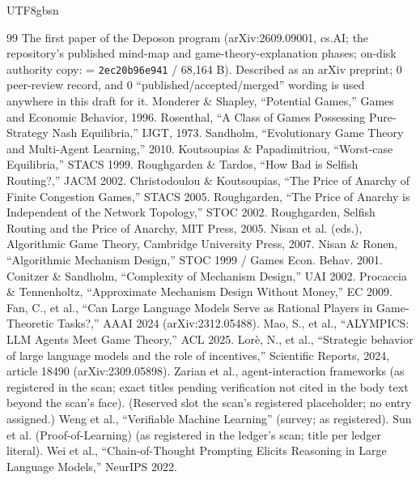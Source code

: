 \documentclass[11pt,letterpaper]{article}
\begin{document}
\begin{CJK}{UTF8}{gbsn}
\begin{thebibliography}{99}
 The first paper of the Deposon program (arXiv:2609.09001, cs.AI; the repository's published mind-map and game-theory-explanation phases; on-disk authority copy:  = \texttt{2ec20b96e941} / 68,164 B). Described as an arXiv preprint; 0 peer-review record, and 0 ``published/accepted/merged'' wording is used anywhere in this draft for it.
 Monderer \& Shapley, ``Potential Games,'' Games and Economic Behavior, 1996.
 Rosenthal, ``A Class of Games Possessing Pure-Strategy Nash Equilibria,'' IJGT, 1973.
 Sandholm, ``Evolutionary Game Theory and Multi-Agent Learning,'' 2010.
 Koutsoupias \& Papadimitriou, ``Worst-case Equilibria,'' STACS 1999.
 Roughgarden \& Tardos, ``How Bad is Selfish Routing?,'' JACM 2002.
 Christodoulou \& Koutsoupias, ``The Price of Anarchy of Finite Congestion Games,'' STACS 2005.
 Roughgarden, ``The Price of Anarchy is Independent of the Network Topology,'' STOC 2002.
 Roughgarden, Selfish Routing and the Price of Anarchy, MIT Press, 2005.
 Nisan et al. (eds.), Algorithmic Game Theory, Cambridge University Press, 2007.
 Nisan \& Ronen, ``Algorithmic Mechanism Design,'' STOC 1999 / Games Econ. Behav. 2001.
 Conitzer \& Sandholm, ``Complexity of Mechanism Design,'' UAI 2002.
 Procaccia \& Tennenholtz, ``Approximate Mechanism Design Without Money,'' EC 2009.
 Fan, C., et al., ``Can Large Language Models Serve as Rational Players in Game-Theoretic Tasks?,'' AAAI 2024 (arXiv:2312.05488).
 Mao, S., et al., ``ALYMPICS: LLM Agents Meet Game Theory,'' ACL 2025.
 Lor\`e, N., et al., ``Strategic behavior of large language models and the role of incentives,'' Scientific Reports, 2024, article 18490 (arXiv:2309.05898).
 Zarian et al., agent-interaction frameworks (as registered in the scan; exact titles pending verification \textemdash{} not cited in the body text beyond the scan's face).
 (Reserved slot \textemdash{} the scan's registered placeholder; no entry assigned.)
 Weng et al., ``Verifiable Machine Learning'' (survey; as registered).
 Sun et al. (Proof-of-Learning) (as registered in the ledger's scan; title per ledger literal).
 Wei et al., ``Chain-of-Thought Prompting Elicits Reasoning in Large Language Models,'' NeurIPS 2022.

\end{thebibliography}
\end{CJK}
\end{document}
